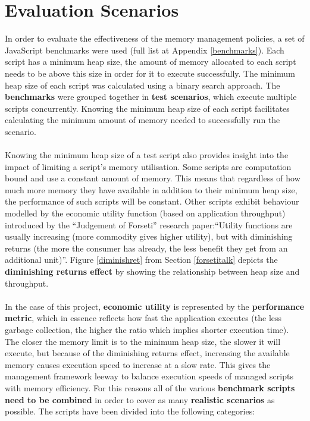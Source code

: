 \documentclass{l4proj}
\begin{document}
\section{Evaluation Scenarios}
\hspace*{1em} In order to evaluate the effectiveness of the memory management policies, a set of JavaScript benchmarks were used (full list at Appendix \ref{benchmarks}). Each script has a minimum heap size, the amount of memory allocated to each script needs to be above this size in order for it to execute successfully. The minimum heap size of each script was calculated using a binary search approach. The \textbf{benchmarks} were grouped together in \textbf{test scenarios}, which execute multiple scripts concurrently. Knowing the minimum heap size of each script facilitates calculating the minimum amount of memory needed to successfully run the scenario. 
\\\\
\hspace*{1em} Knowing the minimum heap size of a test script also provides insight into the impact of limiting a script's memory utilisation. Some scripts are computation bound and use a constant amount of memory. This means that regardless of how much more memory they have available in addition to their minimum heap size, the performance of such scripts will be constant. Other scripts exhibit behaviour modelled by the economic utility function (based on application throughput) introduced by the ``Judgement of Forseti'' research paper:``Utility functions are usually increasing (more commodity gives higher utility), but with diminishing returns (the more the consumer has already, the less benefit they get from an additional unit)''\cite{diminishreturns}. Figure \ref{diminishret} from Section \ref{forsetitalk} depicts the \textbf{diminishing returns effect} by showing the relationship between heap size and throughput.  
\\\\
\hspace*{1em} In the case of this project, \textbf{economic utility} is represented by the \textbf{performance metric}, which in essence reflects how fast the application executes (the less garbage collection, the higher the ratio which implies shorter execution time). The closer the memory limit is to the minimum heap size, the slower it will execute, but because of the diminishing returns effect, increasing the available memory causes execution speed to increase at a slow rate. This gives the management framework leeway to balance execution speeds of managed scripts with memory efficiency. For this reasons all of the various \textbf{benchmark scripts need to be combined} in order to cover as many \textbf{realistic scenarios} as possible. The scripts have been divided into the following categories:
\end{document}
